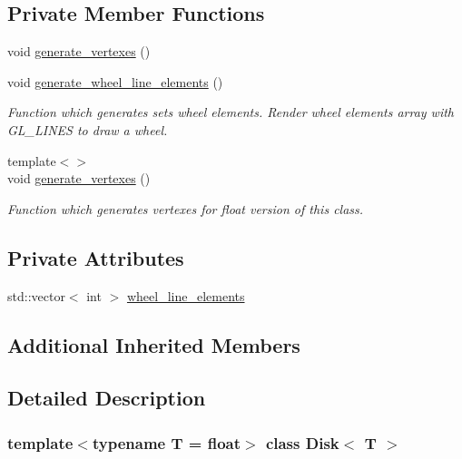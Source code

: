 \subsection*{Private Member Functions}
\begin{DoxyCompactItemize}
\item 
void \mbox{\hyperlink{classDisk_a1588532798901180b1eef6f3e1fb83f6}{generate\+\_\+vertexes}} ()
\item 
void \mbox{\hyperlink{classDisk_a4637847208b7236010085ca67f49e39a}{generate\+\_\+wheel\+\_\+line\+\_\+elements}} ()
\begin{DoxyCompactList}\small\item\em Function which generates sets wheel elements. Render wheel elements array with G\+L\+\_\+\+L\+I\+N\+ES to draw a wheel. \end{DoxyCompactList}\item 
{\footnotesize template$<$$>$ }\\void \mbox{\hyperlink{classDisk_a55648a13c42982087f60742da15c2c41}{generate\+\_\+vertexes}} ()
\begin{DoxyCompactList}\small\item\em Function which generates vertexes for float version of this class. \end{DoxyCompactList}\end{DoxyCompactItemize}
\subsection*{Private Attributes}
\begin{DoxyCompactItemize}
\item 
std\+::vector$<$ int $>$ \mbox{\hyperlink{classDisk_aa008e8bd0e7acdb4a1a56a8f44f048d7}{wheel\+\_\+line\+\_\+elements}}
\end{DoxyCompactItemize}
\subsection*{Additional Inherited Members}


\subsection{Detailed Description}
\subsubsection*{template$<$typename T = float$>$\newline
class Disk$<$ T $>$}

